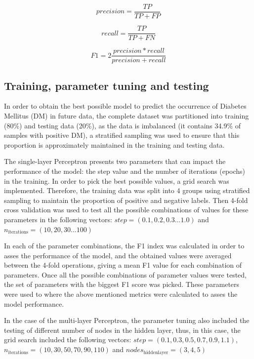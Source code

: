 \documentclass[10pt,twocolumn,letterpaper]{article}
\begin{document}
\begin{equation}
precision = \frac{TP}{TP+FP}
\end{equation}

\begin{equation}
recall = \frac{TP}{TP+FN}
\end{equation}

\begin{equation}
F1 = 2 \frac{precision * recall}{precision + recall}
\end{equation}

\subsection{Training, parameter tuning and testing}

In order to obtain the best possible model to predict the occurrence of Diabetes Mellitus (DM) in future data, the complete dataset was partitioned into training (80\%) and testing data (20\%), as the data is imbalanced (it contains 34.9\% of samples with positive DM), a stratified sampling was used to ensure that this proportion is approximately maintained in the training and testing data. 

The single-layer Perceptron presents two parameters that can impact the performance of the model: the step value and the number of iterations (epochs) in the training. In order to pick the best possible values, a grid search was implemented. Therefore, the training data was split into 4 groups using stratified sampling to maintain the proportion of positive and negative labels. Then 4-fold cross validation was used to test all the possible combinations of values for these parameters in the following vectors: $step = (0.1,0.2,0.3...1.0)$ and $n_\mathrm{iterations} = (10,20,30...100)$

In each of the parameter combinations, the F1 index was calculated in order to asses the performance of the model, and the obtained values were averaged between the 4-fold operations, giving a mean F1 value for each combination of parameters. Once all the possible combinations of parameter values were tested, the set of parameters with the biggest F1 score was picked. These parameters were used to  where the above mentioned metrics were calculated to asses the model performance.

In the case of the multi-layer Perceptron, the parameter tuning also included the testing of different number of nodes in the hidden layer, thus, in this case, the grid search included the following vectors: $step = (0.1,0.3,0.5,0.7,0.9,1.1)$, $n_\mathrm{iterations} = (10,30,50,70,90,110)$ and $nodes_\mathrm{hidden layer} = (3,4,5)$
\end{document}
